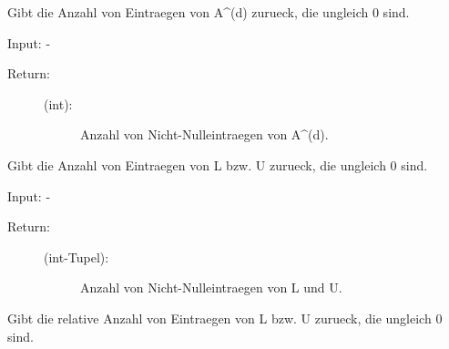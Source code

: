 \documentclass[letterpaper,10pt,ngerman]{sphinxmanual}
\begin{document}
\begin{fulllineitems}
\begin{fulllineitems}
\begin{description}
\end{description}

\end{fulllineitems}


\begin{fulllineitems}
\label{\detokenize{index:sparse_erw.Sparse.anz_nn_abs}}
Gibt die Anzahl von Eintraegen von A\textasciicircum{}(d) zurueck, die ungleich 0 sind.

Input: -
\begin{description}
\item[{Return:}] \leavevmode\begin{description}
\item[{(int):}] \leavevmode
Anzahl von Nicht-Nulleintraegen von A\textasciicircum{}(d).

\end{description}

\end{description}

\end{fulllineitems}


\begin{fulllineitems}
\label{\detokenize{index:sparse_erw.Sparse.anz_nn_lu_abs}}
Gibt die Anzahl von Eintraegen von L bzw. U zurueck, die ungleich 0 sind.

Input: -
\begin{description}
\item[{Return:}] \leavevmode\begin{description}
\item[{(int-Tupel):}] \leavevmode
Anzahl von Nicht-Nulleintraegen von L und U.

\end{description}

\end{description}

\end{fulllineitems}


\begin{fulllineitems}
\label{\detokenize{index:sparse_erw.Sparse.anz_nn_lu_rel}}
Gibt die relative Anzahl von Eintraegen von L bzw. U zurueck, die ungleich 0 sind.


\end{fulllineitems}
\end{fulllineitems}
\end{document}
